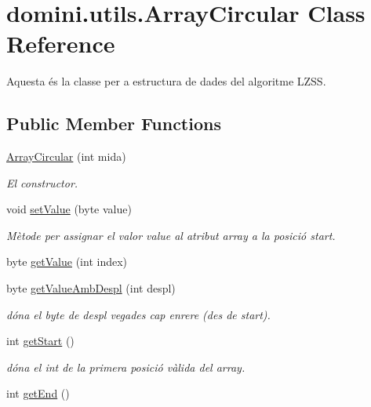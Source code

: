 \hypertarget{classdomini_1_1utils_1_1ArrayCircular}{}\section{domini.\+utils.\+Array\+Circular Class Reference}
\label{classdomini_1_1utils_1_1ArrayCircular}


Aquesta és la classe per a estructura de dades del algoritme L\+Z\+SS.  


\subsection*{Public Member Functions}
\begin{DoxyCompactItemize}
\item 
\hyperlink{classdomini_1_1utils_1_1ArrayCircular_add69c3bd37b2a3ef6069bd3b5df93fec}{Array\+Circular} (int mida)
\begin{DoxyCompactList}\small\item\em El constructor. \end{DoxyCompactList}\item 
void \hyperlink{classdomini_1_1utils_1_1ArrayCircular_a29e48f57c422739fff65e1f5d14c72c2}{set\+Value} (byte value)
\begin{DoxyCompactList}\small\item\em Mètode per assignar el valor value al atribut array a la posició start. \end{DoxyCompactList}\item 
byte \hyperlink{classdomini_1_1utils_1_1ArrayCircular_acbed36ebcc550922c4485c19ce5be53e}{get\+Value} (int index)
\item 
byte \hyperlink{classdomini_1_1utils_1_1ArrayCircular_aa36c40061ff0f3ea0ae15f5b06900e94}{get\+Value\+Amb\+Despl} (int despl)
\begin{DoxyCompactList}\small\item\em dóna el byte de despl vegades cap enrere (des de start). \end{DoxyCompactList}\item 
int \hyperlink{classdomini_1_1utils_1_1ArrayCircular_a3527e861f31137d21dd09e4fe452badd}{get\+Start} ()
\begin{DoxyCompactList}\small\item\em dóna el int de la primera posició vàlida del array. \end{DoxyCompactList}\item 
int \hyperlink{classdomini_1_1utils_1_1ArrayCircular_a3fe38ed7aa9d3b4f99bc4c80cd72bb3e}{get\+End} ()

\end{DoxyCompactItemize}
